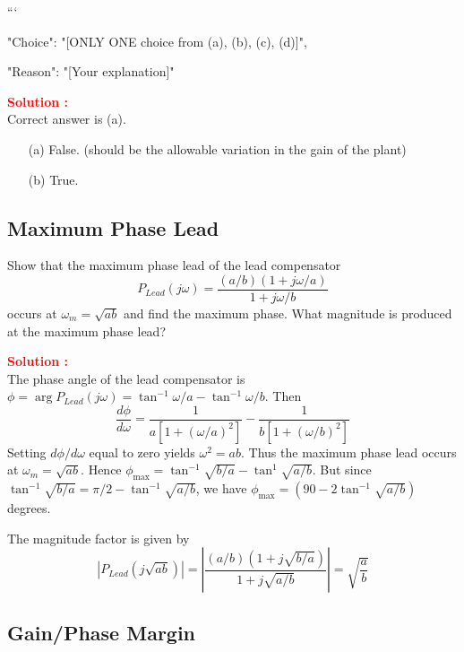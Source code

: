 \documentclass[12pt]{article}
\begin{document}
```
{

"Choice": "[ONLY ONE choice from (a), (b), (c), (d)]",

"Reason": "[Your explanation]"

}


\textbf{\textcolor{red}{Solution :}} \\
Correct answer is (a).\\
\begin{itemize}
    \item[(a)] False. (should be the allowable variation in the gain of the plant) 
    \item[(b)] True. 
\end{itemize}
\clearpage

\subsection{Maximum Phase Lead}

Show that the maximum phase lead of the lead compensator
\begin{equation}
    P_{Lead}(j\omega) = \frac{(a/b)(1+j\omega/a)}{1+j\omega/b}
\end{equation}
occurs at \(\omega_m = \sqrt{ab}\) and find the maximum phase. What magnitude is produced at the maximum phase lead?

\textbf{\textcolor{red}{Solution :}} \\
The phase angle of the lead compensator is \(\phi = \arg P_{Lead}(j\omega) = \tan^{-1} \omega/a - \tan^{-1} \omega/b\). Then
\begin{equation}
    \frac{d\phi}{d\omega} = \frac{1}{a[1+(\omega/a)^2]} - \frac{1}{b[1+(\omega/b)^2]}
\end{equation}
Setting \(d\phi/d\omega\) equal to zero yields \(\omega^2 = ab\). Thus the maximum phase lead occurs at \(\omega_m = \sqrt{ab}\). Hence \(\phi_{\max} = \tan^{-1}\sqrt{b/a}-\tan^{1}\sqrt{a/b}\). But since \(\tan^{-1}\sqrt{b/a} = \pi/2-\tan^{-1}\sqrt{a/b}\), we have \(\phi_{\max} = (90 - 2\tan^{-1}\sqrt{a/b})\) degrees.

The magnitude factor is given by
\[|P_{Lead}(j\sqrt{ab})| = |\frac{(a/b)(1+j\sqrt{b/a})}{1+j\sqrt{a/b}}| = \sqrt{\frac{a}{b}}\]
\clearpage

\subsection{Gain/Phase Margin}
\end{document}
